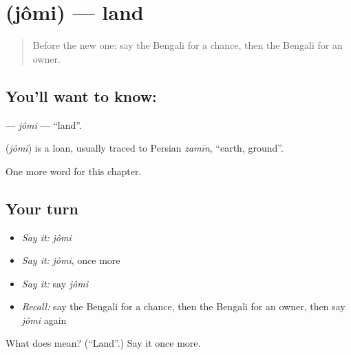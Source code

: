 \section[\texorpdfstring{\bn{জমি} (jômi)}{জমি (jômi)}]{ (jômi) — land}

\label{lesson:BN-C98-jomi}



\begin{quote}
Before the new one: say the Bengali for a chance, then the Bengali for an owner.
\end{quote}

\subsection*{You'll want to know: }
\textbf{} — \emph{jômi} — \textquotedblleft{}land\textquotedblright{}.

\begin{cousinweb}
\textbf{} (\emph{jômi}) is a loan, usually traced to Persian \emph{zamīn}, \textquotedblleft{}earth, ground\textquotedblright{}.
\end{cousinweb}

\begin{grammarlens}[title={What you've built}]
One more word for this chapter.
\end{grammarlens}

\subsection*{Your turn}
\begin{itemize}
\raggedright
  \item \emph{Say it:} \emph{jômi}
  \item \emph{Say it:} \emph{jômi}, once more
  \item \emph{Say it:} say \emph{jômi}
  \item \emph{Recall:} say the Bengali for a chance, then the Bengali for an owner, then say \emph{jômi} again
\end{itemize}

\begin{tcolorbox}[breakable,colback=teal!4,colframe=teal!35!black,title={Before you move on}]
What does  mean? (\textquotedblleft{}Land\textquotedblright{}.) Say it once more.
\end{tcolorbox}
